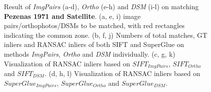 \begin{figure}[htbp]
\begin{center}
{\begin{minipage}[t]{0.48\linewidth}
			\end{minipage}%
		}
		\caption{{\scriptsize Result of \textit{ImgPairs} (a-d), \textit{Ortho} (e-h) and \textit{DSM} (i-l) on matching \textbf{Pezenas 1971 and Satellite}. (a, e, i) image pairs/orthophotos/DSMs to be matched, with red rectangles indicating the common zone. (b, f, j) Numbers of total matches, GT inliers and RANSAC inliers of both SIFT and SuperGlue on methods \textit{ImgPairs}, \textit{Ortho} and \textit{DSM} individually. (c, g, k) Visualization of RANSAC inliers based on $SIFT_{ImgPairs}$, $SIFT_{Ortho}$ and $SIFT_{DSM}$. (d, h, l) Visualization of RANSAC inliers based on $SuperGlue_{ImgPairs}$, $SuperGlue_{Ortho}$ and $SuperGlue_{DSM}$.}}        
		\label{MatchVizPezenas-Satellite1971DSM}
	\end{center}
\end{figure} 



